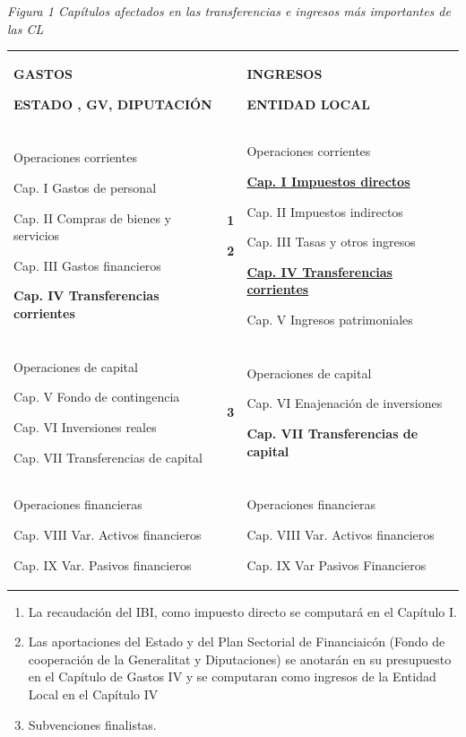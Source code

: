 \documentclass[
]{article}
\providecommand{\tightlist}{%
  \setlength{\itemsep}{0pt}\setlength{\parskip}{0pt}}
\begin{document}
\emph{Figura 1 Capítulos afectados en las transferencias e ingresos más
importantes de las CL}

\begin{longtable}[]{@{}
  >{\raggedright\arraybackslash}p{}
  >{\raggedright\arraybackslash}p{}
  >{\raggedright\arraybackslash}p{}@{}}
\toprule\noalign{}
\endhead
\bottomrule\noalign{}
\endlastfoot
\textbf{GASTOS}

\textbf{ESTADO , GV, DIPUTACIÓN} & & \textbf{INGRESOS}

\textbf{ENTIDAD LOCAL} \\
Operaciones corrientes

Cap. I Gastos de personal

Cap. II Compras de bienes y servicios

Cap. III Gastos financieros

\textbf{Cap. IV Transferencias corrientes} & \textbf{1}

\textbf{2} & Operaciones corrientes

\textbf{\ul{Cap. I Impuestos directos}}

Cap. II Impuestos indirectos

Cap. III Tasas y otros ingresos

\textbf{\ul{Cap. IV Transferencias corrientes}}

Cap. V Ingresos patrimoniales \\
Operaciones de capital

Cap. V Fondo de contingencia

Cap. VI Inversiones reales

Cap. VII Transferencias de capital & \textbf{3} & Operaciones de capital

Cap. VI Enajenación de inversiones

\textbf{Cap. VII Transferencias de capital} \\
Operaciones financieras

Cap. VIII Var. Activos financieros

Cap. IX Var. Pasivos financieros & & Operaciones financieras

Cap. VIII Var. Activos financieros

Cap. IX Var Pasivos Financieros \\
\end{longtable}

\begin{enumerate}
\def\labelenumi{\arabic{enumi}.}
\tightlist
\item
  La recaudación del IBI, como impuesto directo se computará en el
  Capítulo I.
\item
  Las aportaciones del Estado y del Plan Sectorial de Financiaicón
  (Fondo de cooperación de la Generalitat y Diputaciones) se anotarán en
  su presupuesto en el Capítulo de Gastos IV y se computaran como
  ingresos de la Entidad Local en el Capítulo IV
\item
  Subvenciones finalistas.
\end{enumerate}
\end{document}
